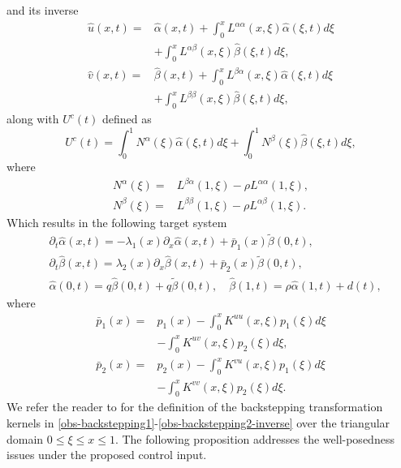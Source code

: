 \documentclass[letterpaper, 10 pt, conference]{ieeeconf}
\begin{document}
and its inverse
\begin{align}
    \hat{u}(x,t)  =&\hat{\alpha}(x,t)+\int_0^x L^{\alpha\alpha}(x, \xi) \hat{\alpha}(\xi,t) d\xi \nonumber\\&+ \int_0^x L^{\alpha\beta}(x,\xi) \hat{\beta}(\xi,t) d\xi, \label{obs-ackstepping1-inverse}\\
    \hat{v}(x,t)  =&\hat{\beta}(x,t)+\int_0^x L^{\beta\alpha}(x, \xi) \hat{\alpha}(\xi,t) d\xi \nonumber\\&+ \int_0^x L^{\beta\beta}(x,\xi) \hat{\beta}(\xi,t) d\xi, \label{obs-backstepping2-inverse}
\end{align}
along with $U^c(t)$ defined as
\begin{equation}\label{cntns-fb}
    U^c(t)=\int_0^1 N^\alpha(\xi) \hat{\alpha}(\xi,t)d\xi+\int_0^1 N^\beta(\xi) \hat{\beta}(\xi,t)d\xi,
\end{equation}
where
\begin{align}
    N^\alpha(\xi)=&L^{\beta\alpha}(1,\xi)-\rho L^{\alpha\alpha}(1,\xi),\label{n-alpha}\\
    N^\beta(\xi)=&L^{\beta\beta}(1,\xi)-\rho L^{\alpha\beta}(1,\xi).\label{n-beta}
\end{align}
Which results in the following target system
\begin{align}
&\partial_t \hat{\alpha}(x,t) =-\lambda_1(x) \partial_x \hat{\alpha}(x,t) + \bar{p}_1(x)\tilde{\beta}(0,t),\label{obs-targetu} \\
&\partial_t \hat{\beta}(x,t)=\lambda_2(x) \partial_x \hat{\beta}(x,t) + \bar{p}_2(x)\tilde{\beta}(0,t),\label{obs-targetv}\\   
&\hat{\alpha}(0,t)=q\hat{\beta}(0,t) + q\tilde{\beta}(0,t),\quad
\hat{\beta}(1,t)=\rho\hat{\alpha}(1,t) + d(t),\label{obs-targetbc}
\end{align}
where
\begin{align}
    \bar{p}_1(x)=&p_1(x)-\int_0^xK^{uu}(x,\xi)p_1(\xi)d\xi\nonumber\\&-\int_0^xK^{uv}(x,\xi)p_2(\xi)d\xi,\label{p1_bar}\\
    \bar{p}_2(x)=&p_2(x)-\int_0^xK^{vu}(x,\xi)p_1(\xi)d\xi\nonumber\\&-\int_0^xK^{vv}(x,\xi)p_2(\xi)d\xi.\label{p2_bar}
\end{align}
We refer the reader to \cite{vazquez2011_2x2hyperbolic} for the definition of the backstepping transformation kernels in \eqref{obs-backstepping1}-\eqref{obs-backstepping2-inverse} over the triangular domain $0\leq\xi\leq x\leq1$. The following proposition addresses the well-posedness issues under the proposed control input.
\end{document}
